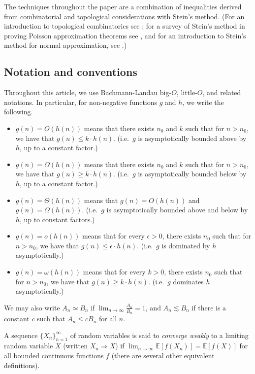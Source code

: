 \documentclass{amsart}
\theoremstyle{definition}
\newcommand{\E}{\mathbb{E}}
\renewcommand{\1}{\mathbb{1}}
\begin{document}
The techniques throughout the paper are a combination of inequalities derived from combinatorial and topological considerations with Stein's method.  (For an introduction to topological combinatorics see \cite{Bjorner}; for a survey of 
Stein's method in proving Poisson approximation theorems see \cite{CDM}, and 
for an introduction to Stein's method for normal approximation, see 
\cite{RR}.)

\subsection{Notation and conventions}

Throughout this article, we use Bachmann-Landau big-$O$, little-$O$, and related notations. In particular, for non-negative functions $g$ and $h$, we write the following.

\begin{itemize}
\item $g(n) = O(h(n))$ means that there exists $n_0$ and $k$ such that for $n > n_0$, we have that $g(n) \le k \cdot h(n)$. (i.e.\ $g$ is asymptotically bounded above by $h$, up to a constant factor.) 
\item $g(n) = \Omega(h(n))$ means that there exists $n_0$ and $k$ such that for $n > n_0$, we have that  $g(n) \ge k \cdot h(n)$. (i.e.\ $g$ is asymptotically bounded below by $h$, up to a constant factor.) 
\item $g(n) = \Theta(h(n))$ means that $g(n) = O(h(n))$ and $g(n) = \Omega(h(n))$. (i.e.\ $g$ is asymptotically bounded above and below by $h$, up to constant factors.)
\item $g(n) = o(h(n))$ means that for every $\epsilon > 0$, there exists $n_0$ such that for $n > n_0$, we have that  $g(n) \le \epsilon \cdot h(n)$. (i.e.\ $g$ is dominated by $h$ asymptotically.)
\item $g(n) = \omega(h(n))$ means that for every $k >0$, there exists $n_0$ such that for $n > n_0$, we have that  $g(n) \ge k \cdot h(n)$. (i.e.\ $g$ dominates $h$ asymptotically.)
\end{itemize}
We may also write $A_n\simeq B_n$ if $\lim_{n\to\infty}\frac{A_n}{B_n}=1$, and 
$A_n\lesssim B_n$ if there is a constant $c$  such 
that $A_n\le c B_n$ for all $n$.

A sequence $\{X_n\}_{n=1}^\infty$ of random variables is said to {\it converge
weakly} to a limiting random variable $X$ (written $X_n\Rightarrow X$)
if $\lim_{n\to\infty}\E[f(X_n)]=\E[f(X)]$ for all bounded continuous
functions $f$ (there are several other equivalent definitions).
\end{document}
